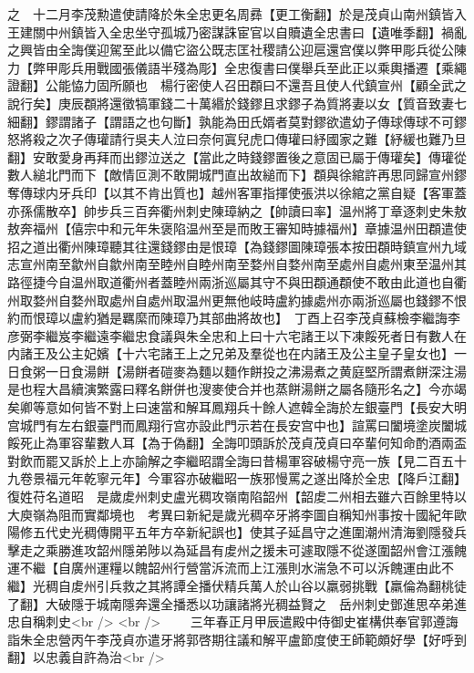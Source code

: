 之　十二月李茂勲遣使請降於朱全忠更名周彞【更工衡翻】於是茂貞山南州鎮皆入王建關中州鎮皆入全忠坐守孤城乃密謀誅宦官以自贖遺全忠書曰【遺唯季翻】禍亂之興皆由全誨僕迎駕至此以備它盜公既志匡社稷請公迎扈還宫僕以弊甲彫兵從公陳力【弊甲彫兵用戰國張儀語半殘為彫】全忠復書曰僕舉兵至此正以乘輿播遷【乘繩證翻】公能恊力固所願也　楊行密使人召田頵曰不還吾且使人代鎮宣州【顧全武之說行矣】庚辰頵將還徵犒軍錢二十萬緡於錢鏐且求鏐子為質將妻以女【質音致妻七細翻】鏐謂諸子【謂語之也句斷】孰能為田氏婿者莫對鏐欲遣幼子傳球傳球不可鏐怒將殺之次子傳瓘請行吳夫人泣曰奈何寘兒虎口傳瓘曰紓國家之難【紓緩也難乃旦翻】安敢愛身再拜而出鏐泣送之【當此之時錢鏐置後之意固已屬于傳瓘矣】傳瓘從數人縋北門而下【敵情叵測不敢開城門直出故縋而下】頵與徐綰許再思同歸宣州鏐奪傳球内牙兵印【以其不肯出質也】越州客軍指揮使張洪以徐綰之黨自疑【客軍蓋亦孫儒散卒】帥步兵三百奔衢州刺史陳璋納之【帥讀曰率】温州將丁章逐刺史朱敖敖奔福州【僖宗中和元年朱褒陷温州至是而敗王審知時據福州】章據温州田頵遣使招之道出衢州陳璋聽其往還錢鏐由是恨璋【為錢鏐圖陳璋張本按田頵時鎮宣州九域志宣州南至歙州自歙州南至睦州自睦州南至婺州自婺州南至處州自處州東至温州其路徑捷今自温州取道衢州者蓋睦州兩浙巡屬其守不與田頵通頵使不敢由此道也自衢州取婺州自婺州取處州自處州取温州更無他岐時盧約據處州亦兩浙巡屬也錢鏐不恨約而恨璋以盧約猶是羈縻而陳璋乃其部曲將故也】　丁酉上召李茂貞蘇檢李繼誨李彦弼李繼岌李繼遠李繼忠食議與朱全忠和上曰十六宅諸王以下凍餒死者日有數人在内諸王及公主妃嬪【十六宅諸王上之兄弟及羣從也在内諸王及公主皇子皇女也】一日食粥一日食湯餅【湯餅者磑麥為麵以麵作餅投之沸湯煮之黄庭堅所謂煮餅深注湯是也程大昌續演繁露曰釋名餅併也溲麥使合并也蒸餅湯餅之屬各隨形名之】今亦竭矣卿等意如何皆不對上曰速當和解耳鳳翔兵十餘人遮韓全誨於左銀臺門【長安大明宫城門有左右銀臺門而鳳翔行宫亦設此門示若在長安宫中也】諠罵曰闔境塗炭闔城餒死止為軍容輩數人耳【為于偽翻】全誨叩頭訴於茂貞茂貞曰卒輩何知命酌酒兩盃對飲而罷又訴於上上亦諭解之李繼昭謂全誨曰昔楊軍容破楊守亮一族【見二百五十九卷景福元年乾寧元年】今軍容亦破繼昭一族邪慢罵之遂出降於全忠【降戶江翻】復姓苻名道昭　是歲䖍州刺史盧光稠攻嶺南陷韶州【韶䖍二州相去雖六百餘里特以大庾嶺為阻而實鄰境也　考異曰新紀是歲光稠卒牙將李圖自稱知州事按十國紀年歐陽修五代史光稠傳開平五年方卒新紀誤也】使其子延昌守之進圍潮州清海劉隱發兵擊走之乘勝進攻韶州隱弟陟以為延昌有䖍州之援未可遽取隱不從遂圍韶州會江漲餽運不繼【自廣州運糧以餽韶州行營當泝流而上江漲則水湍急不可以泝餽運由此不繼】光稠自䖍州引兵救之其將譚全播伏精兵萬人於山谷以羸弱挑戰【羸倫為翻桃徒了翻】大破隱于城南隱奔還全播悉以功讓諸將光稠益賢之　岳州刺史鄧進思卒弟進忠自稱刺史<br />
<br />
　　三年春正月甲辰遣殿中侍御史崔構供奉官郭遵誨詣朱全忠營丙午李茂貞亦遣牙將郭啓期往議和解平盧節度使王師範頗好學【好呼到翻】以忠義自許為治<br />
